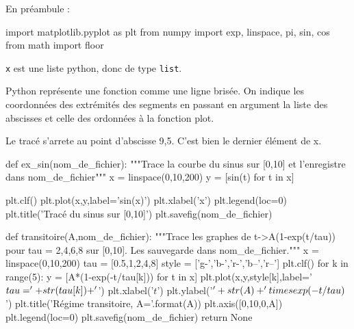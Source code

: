 En préambule : 
\begin{pyverbatim}
import matplotlib.pyplot as plt
from numpy import exp, linspace, pi, sin, cos
from math import floor
\end{pyverbatim}


\question{}
\texttt x est une liste python, donc de type \texttt{list}.

\question{}
Python représente une fonction comme une ligne brisée. 
On indique les coordonnées des extrémités des segments en passant en argument la liste des abscisses et celle des ordonnées à la fonction plot.

\question{}
Le tracé s'arrete au point d'abscisse 9,5. C'est bien le dernier élément de x.

\question{}
\begin{pyverbatim}
def ex_sin(nom_de_fichier):
    """Trace la courbe du sinus sur [0,10] et l'enregistre dans nom_de_fichier"""
    x = linspace(0,10,200)
    y = [sin(t) for t in x]

    plt.clf()
    plt.plot(x,y,label='sin(x)')
    plt.xlabel('x')
    plt.legend(loc=0)
    plt.title('Tracé du sinus sur [0,10]')
    plt.savefig(nom_de_fichier)
\end{pyverbatim}
\question{}
\begin{pyverbatim}
def transitoire(A,nom_de_fichier):
    """Trace les graphes de t->A(1-exp(t/tau)) pour tau = 2,4,6,8 sur [0,10].
       Les sauvegarde dans nom_de_fichier."""
    x = linspace(0,10,200)
    tau = [0.5,1,2,4,8]
    style = ['g-','b-','r-','b--','r--']
    plt.clf()
    for k in range(5):
       y = [A*(1-exp(-t/tau[k])) for t in x]
       plt.plot(x,y,style[k],label='$\\tau='+str(tau[k])+'$') 
    plt.xlabel('$t$')
    plt.ylabel('$'+str(A)+'\\times\\exp(-t / \\tau)$')
    plt.title('Régime transitoire, A={}'.format(A))
    plt.axis([0,10,0,A])
    plt.legend(loc=0)
    plt.savefig(nom_de_fichier)
    return None
\end{pyverbatim}